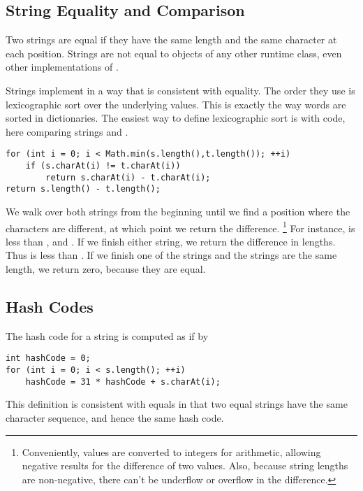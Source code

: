 
\subsection{String Equality and Comparison}

Two strings are equal if they have the same length and the same
character at each position.  Strings are not equal to objects of any
other runtime class, even other implementations of .

Strings implement  in a way that is
consistent with equality.  The order they use is lexicographic
sort over the underlying  values.  This is exactly the
way words are sorted in dictionaries.  The easiest way to define
lexicographic sort is with code, here comparing strings 
and .
%
\begin{verbatim}
for (int i = 0; i < Math.min(s.length(),t.length()); ++i)
    if (s.charAt(i) != t.charAt(i))
        return s.charAt(i) - t.charAt(i);
return s.length() - t.length();
\end{verbatim}

We walk over both strings from the beginning until we find a position
where the characters are different, at which point we return the
difference.%
%
\footnote{Conveniently,  values are converted to integers
  for arithmetic, allowing negative results for the difference of two
  values.  Also, because string lengths are non-negative, there can't
  be underflow or overflow in the difference.}
%
For instance,  is less than 
, and .  If we finish either string, we
return the difference in lengths.  Thus  is less than
.  If we finish one of the strings and the strings are
the same length, we return zero, because they are equal.

\subsection{Hash Codes}

The hash code for a string  is computed as if by
%
\begin{verbatim}
int hashCode = 0;
for (int i = 0; i < s.length(); ++i)
    hashCode = 31 * hashCode + s.charAt(i);
\end{verbatim}
%
This definition is consistent with equals in that two equal strings
have the same character sequence, and hence the same hash code.

